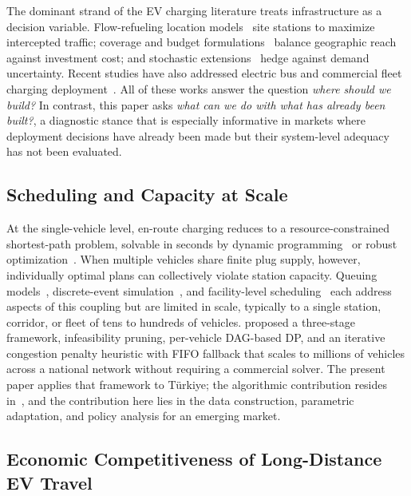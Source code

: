 The dominant strand of the EV charging literature treats infrastructure as a decision variable. Flow-refueling location models~\cite{kuby_2005,upchurch_2009} site stations to maximize intercepted traffic; coverage and budget formulations~\cite{frade_2011,li_2016} balance geographic reach against investment cost; and stochastic extensions~\cite{xiong_2024} hedge against demand uncertainty. Recent studies have also addressed electric bus and commercial fleet charging deployment~\cite{BAZARNOVI2025,BAZARNOVI2025583,DAVATGARI2024953,KALEEM2026103403,DAVATGARI2024361}. All of these works answer the question \textit{where should we build?} In contrast, this paper asks \textit{what can we do with what has already been built?}, a diagnostic stance that is especially informative in markets where deployment decisions have already been made but their system-level adequacy has not been evaluated.

\subsection{Scheduling and Capacity at Scale}

At the single-vehicle level, en-route charging reduces to a resource-constrained shortest-path problem, solvable in seconds by dynamic programming~\cite{bagheri_2020,zhang_2018} or robust optimization~\cite{he_2018}. When multiple vehicles share finite plug supply, however, individually optimal plans can collectively violate station capacity. Queuing models~\cite{bae_2015}, discrete-event simulation~\cite{zhang_2019}, and facility-level scheduling~\cite{lee_2020,tang_2016} each address aspects of this coupling but are limited in scale, typically to a single station, corridor, or fleet of tens to hundreds of vehicles. \citet{cokyasar2026electrification} proposed a three-stage framework, infeasibility pruning, per-vehicle DAG-based DP, and an iterative congestion penalty heuristic with FIFO fallback that scales to millions of vehicles across a national network without requiring a commercial solver. The present paper applies that framework to T\"{u}rkiye; the algorithmic contribution resides in~\cite{cokyasar2026electrification}, and the contribution here lies in the data construction, parametric adaptation, and policy analysis for an emerging market.

\subsection{Economic Competitiveness of Long-Distance EV Travel}

